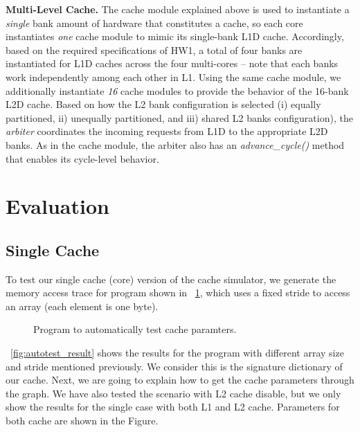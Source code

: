 \documentclass[12pt]{report}
\newcommand{\Fig}[1]{\figurename~\ref{#1}}
\begin{document}
\textbf{Multi-Level Cache.} The cache module explained above is used to instantiate a \emph{single} bank amount of hardware that constitutes a cache, so each core instantiates
\emph{one} cache module to mimic its single-bank L1D cache. Accordingly, based on the required specifications of HW1, a total of four banks
are instantiated for L1D caches across the four multi-cores -- note that each banks work independently among each other in L1. Using the same 
cache module, we additionally instantiate \emph{16} cache modules to provide the behavior of the 16-bank L2D cache. Based on how the L2 bank
configuration is selected (i) equally partitioned, ii) unequally partitioned, and iii) shared L2 banks configuration), the \emph{arbiter} coordinates the incoming requests
from L1D to the appropriate L2D banks. As in the cache module, the arbiter also has an \emph{advance\_cycle()} method that enables its cycle-level
behavior.
























\newpage
\section{Evaluation}
\subsection{Single Cache}
\label{single_cache}
To test our single cache (core) version of the cache simulator, we generate the memory access trace for program shown in \Fig{fig:autotest}, which uses a fixed stride to access an array (each element is one byte). 

\begin{figure}[ht]

\caption{Program to automatically test cache paramters.}
\label{fig:autotest}
\end{figure}

\Fig{fig:autotest_result} shows the results for the program with different array size and stride mentioned previously. We consider this is the signature dictionary of our cache. Next, we are going to explain how to get the cache parameters through the graph. We have also tested the scenario with L2 cache disable, but we only show the results for the single case with both L1 and L2 cache. Parameters for both cache are shown in the Figure.
\end{document}
